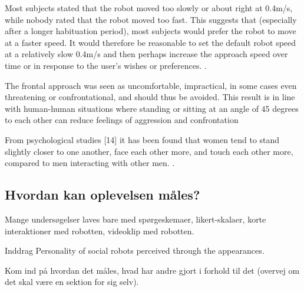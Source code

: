 Most subjects stated that the robot moved too slowly or about right at 0.4m/s, while nobody rated that the robot moved too fast. This suggests that (especially after a longer habituation period), most subjects would prefer the robot to move at a faster speed. It would therefore be reasonable to set the default robot speed at a relatively slow 0.4m/s and then perhaps increase the approach speed over time or in response to the user’s wishes or preferences. \textcite[s. 178]{PDF:HowMayIServeYou}. 

The frontal approach was seen as uncomfortable, impractical, in some cases even threatening or confrontational, and should thus be avoided. This result is in line with human-human situations where standing or sitting at an angle of 45 degrees to each other can reduce feelings of aggression and confrontation \textcite[s. 178]{PDF:HowMayIServeYou}

From psychological studies [14] it has been found that women tend to stand slightly closer to one another, face each other more, and touch each other more, compared to men interacting with other men. \textcite[s. 178]{PDF:HowMayIServeYou}. 

\subsection{Hvordan kan oplevelsen måles?}
\label{InteraktionSocialeRobotterOplevelse}
%
Mange undersøgelser laves bare med spørgeskemaer, likert-skalaer, korte interaktioner med robotten, videoklip med robotten. 

Inddrag Personality of social robots perceived through the appearances.

Kom ind på hvordan det måles, hvad har andre gjort i forhold til det (overvej om det skal være en sektion for sig selv).\blankline













